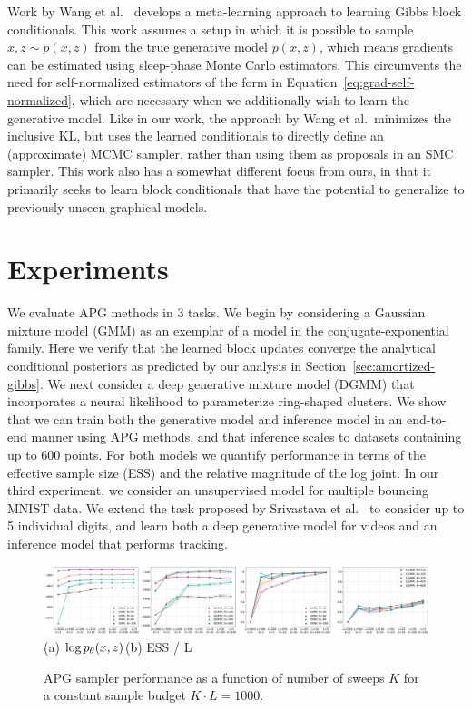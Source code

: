 \documentclass{article}
\theoremstyle{definition}
\begin{document}
Work by Wang et al.~\cite{wang2018meta} develops a meta-learning approach to learning Gibbs block conditionals. This work assumes a setup in which it is possible to sample $x, z \sim p(x, z)$ from the true generative model $p(x,z)$, which means gradients can be estimated using sleep-phase Monte Carlo estimators. This circumvents the need for self-normalized estimators of the form in Equation~\ref{eq:grad-self-normalized}, which are necessary when we additionally wish to learn the generative model. Like in our work, the approach by Wang et al.~minimizes the inclusive KL, but uses the learned conditionals to directly define an (approximate) MCMC sampler, rather than using them as proposals in an SMC sampler. This work also has a somewhat different focus from ours, in that it primarily seeks to learn block conditionals that have the potential to generalize to previously unseen graphical models.

\section{Experiments}
\label{sec:experiments}

We evaluate APG methods in 3 tasks. We begin by considering a Gaussian mixture model (GMM) as an exemplar of a model in the conjugate-exponential family. Here we verify that the learned block updates converge the analytical conditional posteriors as predicted by our analysis in Section~\ref{sec:amortized-gibbs}. We next consider a deep generative mixture model (DGMM) that incorporates a neural likelihood to parameterize ring-shaped clusters. We show that we can train both the generative model and inference model in an end-to-end manner using APG methods, and that inference scales to datasets containing up to 600 points. For both models we quantify performance in terms of the effective sample size (ESS) and the relative magnitude of the log joint. In our third experiment, we consider an unsupervised model for multiple bouncing MNIST data. We extend the task proposed by Srivastava et al.~\cite{srivastava2015unsupervised} to consider up to 5 individual digits, and learn both a deep generative model for videos and an inference model that performs tracking.
\begin{figure}[t!]
  \centering
  \includegraphics[width=1.0\linewidth]{figures/both-budget-dot-v2.pdf}
  \vspace*{-3mm}
  {\small \hspace{1em}(a) $\log p_\theta(x, z)$\hspace{22em}(b) ESS / L}\\
  \caption{APG sampler performance as a function of number of sweeps $K$ for a constant sample budget $K \cdot L = 1000$.}
  \label{fig:budget}
\end{figure}
\end{document}
